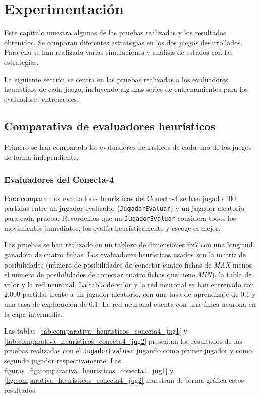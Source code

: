 \chapter{Experimentación}
\label{cap:experimentacion}
Este capítulo muestra algunas de las pruebas realizadas y los resultados obtenidos.
Se comparan diferentes estrategias en los dos juegos desarrollados.
Para ello se han realizado varias simulaciones y análisis de estados con las estrategias.

La siguiente sección se centra en las pruebas realizadas a los evaluadores heurísticos de cada juego, incluyendo algunas series de entrenamientos para los evaluadores entrenables.

\section{Comparativa de evaluadores heurísticos}  
\label{sec:comparativa_evaluadores_heuristicos}
Primero se han comparado los evaluadores heurísticos de cada uno de los juegos de forma independiente.

\subsection{Evaluadores del Conecta-4}
\label{ssec:comparativa_evaluadores_conecta4}
Para comparar los evaluadores heurísticos del Conecta-4 se han jugado 100 partidas entre un jugador evaluador (\texttt{JugadorEvaluar}) y un jugador aleatorio para cada prueba.
Recordemos que un \texttt{JugadorEvaluar} considera todos los movimientos inmediatos, los evalúa heurísticamente y escoge el mejor.

Las pruebas se han realizado en un tablero de dimensiones 6x7 con una longitud ganadora de cuatro fichas.
Los evaluadores heurísticos usados son la matriz de posibilidades (número de posibilidades de conectar cuatro fichas de \textit{MAX} menos el número de posibilidades de conectar cuatro fichas que tiene \textit{MIN}), la tabla de valor y la red neuronal.
La tabla de valor y la red neuronal se han entrenado con 2.000 partidas frente a un jugador aleatorio, con una tasa de aprendizaje de 0.1 y una tasa de exploración de 0.1.
La red neuronal cuenta con una única neurona en la capa intermedia.

Las tablas~\ref{tab:comparativa_heuristicos_conecta4_jug1} y \ref{tab:comparativa_heuristicos_conecta4_jug2} presentan los resultados de las pruebas realizadas con el \texttt{JugadorEvaluar} jugando como primer jugador y como segundo jugador respectivamente.
Las figuras~\ref{fig:comparativa_heuristicos_conecta4_jug1} y \ref{fig:comparativa_heuristicos_conecta4_jug2} muestran de forma gráfica estos resultados. 

